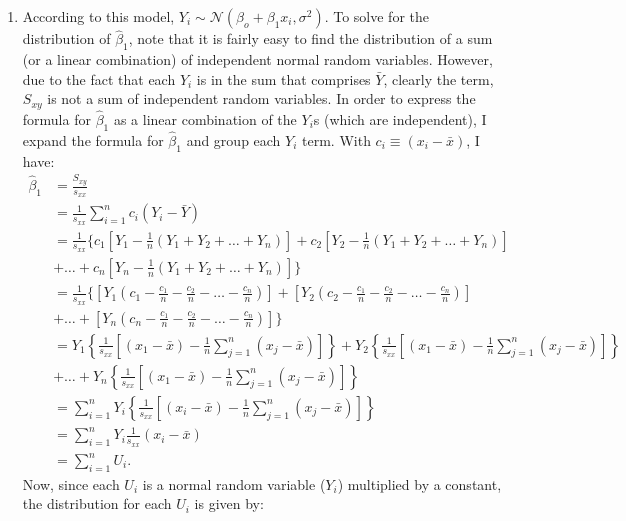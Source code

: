 \begin{problem}{23}$ $
\begin{enumerate}

\item According to this model, $Y_i \sim \mathcal N(\beta_o+\beta_1x_i, \sigma^2)$.  To solve for the distribution of $\hat \beta_1$, note that it is fairly easy to find the distribution of a sum (or a linear combination) of independent normal random variables.  However, due to the fact that each $Y_i$ is in the sum that comprises $\bar Y$, clearly the term, $S_{xy}$ is not a sum of independent random variables.  In order to express the formula for $\hat \beta_1$ as a linear combination of the $Y_i$s (which are independent), I expand the formula for $\hat \beta_1$ and group each $Y_i$ term.  With $c_i \equiv (x_i -\bar x)$, I have:
\begin{align*}
\hat \beta_1 &= \frac{S_{xy}}{s_{xx}}\\
& = \frac{1}{s_{xx}}\sum_{i=1}^n c_i(Y_i-\bar Y) \\
&=\frac{1}{s_{xx}} \Bigg \{c_1\left[ Y_1 -  \frac{1}{n}\left(Y_1+Y_2+\ldots+Y_n \right) \right] +c_2\left[ Y_2 -  \frac{1}{n}\left(Y_1+Y_2+\ldots+Y_n \right) \right]  \\
& + \ldots + c_n\left[ Y_n -  \frac{1}{n}\left(Y_1+Y_2+\ldots+Y_n \right) \right]  \Bigg  \} \\
&=\frac{1}{s_{xx}} \Bigg \{ \left [ Y_1\left(c_1-\frac{c_1}{n}-\frac{c_2}{n} -\ldots-\frac{c_n}{n}\right) \right ]+\left [ Y_2\left(c_2-\frac{c_1}{n}-\frac{c_2}{n} -\ldots-\frac{c_n}{n}\right) \right ] \\
& +\ldots + \left [ Y_n\left(c_n-\frac{c_1}{n}-\frac{c_2}{n} -\ldots-\frac{c_n}{n}\right) \right ] \Bigg \} \\
& = Y_1\left \{\frac{1}{s_{xx}} \left[(x_1- \bar x)-\frac{1}{n}\sum_{j=1}^n(x_j-\bar x) \right] \right \}+Y_2\left \{\frac{1}{s_{xx}} \left[(x_1- \bar x)-\frac{1}{n}\sum_{j=1}^n(x_j-\bar x) \right] \right \} \\
&+ \ldots+Y_n\left \{\frac{1}{s_{xx}} \left[(x_1- \bar x)-\frac{1}{n}\sum_{j=1}^n(x_j-\bar x) \right] \right \} \\
& = \sum_{i=1}^n Y_i\left \{\frac{1}{s_{xx}} \left[(x_i- \bar x)-\frac{1}{n}\sum_{j=1}^n(x_j-\bar x) \right] \right \} \\
& = \sum_{i=1}^n Y_i \frac{1}{s_{xx}}(x_i-\bar x) \\
& = \sum_{i=1}^n U_i.
\end{align*}
Now, since each $U_i$ is a normal random variable ($Y_i$) multiplied by a constant, the distribution for each $U_i$ is given by:

\end{enumerate}
\end{problem}
